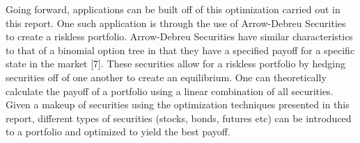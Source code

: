 \documentclass[12pt]{article}
\begin{document}
	Going forward, applications can be built off of this optimization carried out in this report. One such application is through the use of Arrow-Debreu Securities to create a riskless portfolio. Arrow-Debreu Securities have similar characteristics to that of a binomial option tree in that they have a specified payoff for a specific state in the market [7]. These securities allow for a riskless portfolio by hedging securities off of one another to create an equilibrium. One can theoretically calculate the payoff of a portfolio using a linear combination of all securities. Given a makeup of securities using the optimization techniques presented in this report, different types of securities (stocks, bonds, futures etc) can be introduced to a portfolio and optimized to yield the best payoff.


\newpage
{}




\end{document}

